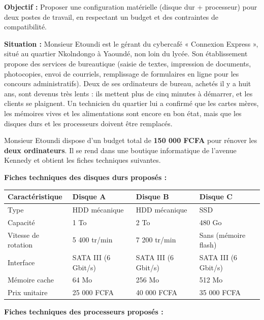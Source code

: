 \documentclass[11pt]{article}
\newcommand{\cle}[1]{{\popxbold\color{popdark}#1}}
\begin{document}
\begin{experience}
\textbf{Objectif :} Proposer une configuration matérielle (disque dur + processeur) pour deux postes de travail, en respectant un budget et des contraintes de compatibilité.

\textbf{Situation :}
Monsieur Etoundi est le gérant du cybercafé « Connexion Express », situé au quartier Nkolndongo à Yaoundé, non loin du lycée. Son établissement propose des services de bureautique (saisie de textes, impression de documents, photocopies, envoi de courriels, remplissage de formulaires en ligne pour les concours administratifs). Deux de ses ordinateurs de bureau, achetés il y a huit ans, sont devenus très lents : ils mettent plus de cinq minutes à démarrer, et les clients se plaignent. Un technicien du quartier lui a confirmé que les cartes mères, les mémoires vives et les alimentations sont encore en bon état, mais que les \cle{disques durs} et les \cle{processeurs} doivent être remplacés.

Monsieur Etoundi dispose d'un budget total de \textbf{150 000 FCFA} pour rénover les \textbf{deux ordinateurs}. Il se rend dans une boutique informatique de l'avenue Kennedy et obtient les fiches techniques suivantes.

\textbf{Fiches techniques des disques durs proposés :}

\begin{center}
\begin{tabularx}{\linewidth}{|l|X|X|X|}
\hline
\rowcolor{popblueL} \textbf{Caractéristique} & \textbf{Disque A} & \textbf{Disque B} & \textbf{Disque C} \\
\hline
Type & HDD mécanique & HDD mécanique & SSD \\
\hline
Capacité & 1 To & 2 To & 480 Go \\
\hline
Vitesse de rotation & 5 400 tr/min & 7 200 tr/min & Sans (mémoire flash) \\
\hline
Interface & SATA III (6 Gbit/s) & SATA III (6 Gbit/s) & SATA III (6 Gbit/s) \\
\hline
Mémoire cache & 64 Mo & 256 Mo & 512 Mo \\
\hline
Prix unitaire & 25 000 FCFA & 40 000 FCFA & 35 000 FCFA \\
\hline
\end{tabularx}
\end{center}

\textbf{Fiches techniques des processeurs proposés :}


\end{experience}
\end{document}
